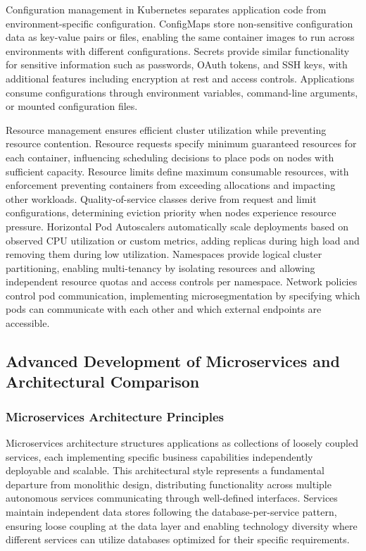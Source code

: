 \documentclass[a4paper, 12pt]{report}
\begin{document}
Configuration management in Kubernetes separates application code from environment-specific configuration. ConfigMaps store non-sensitive configuration data as key-value pairs or files, enabling the same container images to run across environments with different configurations. Secrets provide similar functionality for sensitive information such as passwords, OAuth tokens, and SSH keys, with additional features including encryption at rest and access controls. Applications consume configurations through environment variables, command-line arguments, or mounted configuration files.

Resource management ensures efficient cluster utilization while preventing resource contention. Resource requests specify minimum guaranteed resources for each container, influencing scheduling decisions to place pods on nodes with sufficient capacity. Resource limits define maximum consumable resources, with enforcement preventing containers from exceeding allocations and impacting other workloads. Quality-of-service classes derive from request and limit configurations, determining eviction priority when nodes experience resource pressure. Horizontal Pod Autoscalers automatically scale deployments based on observed CPU utilization or custom metrics, adding replicas during high load and removing them during low utilization. Namespaces provide logical cluster partitioning, enabling multi-tenancy by isolating resources and allowing independent resource quotas and access controls per namespace. Network policies control pod communication, implementing microsegmentation by specifying which pods can communicate with each other and which external endpoints are accessible.

\subsection{Advanced Development of Microservices and Architectural Comparison}

\subsubsection{Microservices Architecture Principles}

Microservices architecture structures applications as collections of loosely coupled services, each implementing specific business capabilities independently deployable and scalable. This architectural style represents a fundamental departure from monolithic design, distributing functionality across multiple autonomous services communicating through well-defined interfaces. Services maintain independent data stores following the database-per-service pattern, ensuring loose coupling at the data layer and enabling technology diversity where different services can utilize databases optimized for their specific requirements.
\end{document}
